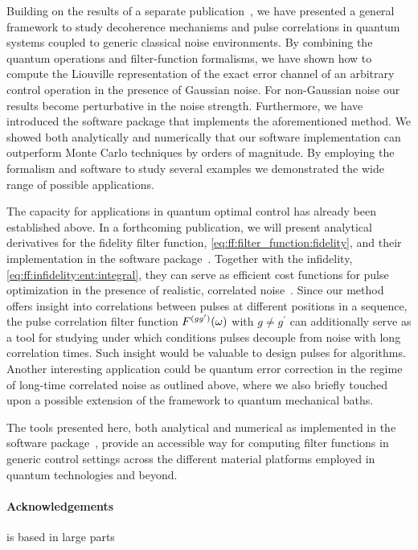 Building on the results of a separate publication~\cite{Cerfontaine2021}, we have presented a general framework to study decoherence mechanisms and pulse correlations in quantum systems coupled to generic classical noise environments.
By combining the quantum operations and filter-function formalisms, we have shown how to compute the Liouville representation of the exact error channel of an arbitrary control operation in the presence of Gaussian noise.
For non-Gaussian noise our results become perturbative in the noise strength.
Furthermore, we have introduced the \filterfunctions \python software package that implements the aforementioned method.
We showed both analytically and numerically that our software implementation can outperform Monte Carlo techniques by orders of magnitude.
By employing the formalism and software to study several examples we demonstrated the wide range of possible applications.

The capacity for applications in quantum optimal control has already been established above.
In a forthcoming publication, we will present analytical derivatives for the fidelity filter function, \cref{eq:ff:filter_function:fidelity}, and their implementation in the software package~\cite{Le2022}.
Together with the infidelity, \cref{eq:ff:infidelity:ent:integral}, they can serve as efficient cost functions for pulse optimization in the presence of realistic, correlated noise~\cite{Teske2022}.
Since our method offers insight into correlations between pulses at different positions in a sequence, the pulse correlation filter function $F^{(gg^\prime)}(\omega)$ with $g\neq g^\prime$ can additionally serve as a tool for studying under which conditions pulses decouple from noise with long correlation times.
Such insight would be valuable to design pulses for algorithms.
Another interesting application could be quantum error correction in the regime of long-time correlated noise as outlined above, where we also briefly touched upon a possible extension of the framework to quantum mechanical baths.


The tools presented here, both analytical and numerical as implemented in the \filterfunctions software package~\cite{Hangleiter_ff}, provide an accessible way for computing filter functions in generic control settings across the different material platforms employed in quantum technologies and beyond.

\paragraph{Acknowledgements}
\Thispart is based in large parts
